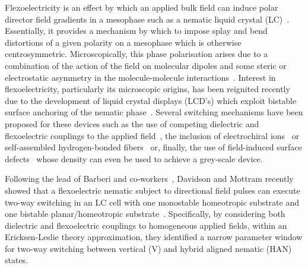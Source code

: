 \documentclass[aps,10pt,twocolumn]{revtex4}
\begin{document}
Flexoelectricity is an effect by which an applied bulk field can induce polar director field gradients in a
mesophase such as a nematic liquid crystal (LC)~\cite{deGennes}. Essentially, it provides a mechanism by which to
impose splay and bend distortions of a given polarity on a mesophase which is otherwise centrosymmetric.
Microscopically, this phase polarisation arises due to a combination of the action of the field on molecular
dipoles and some steric or electrostatic asymmetry in the molecule-molecule
interactions~\cite{Meyer69,ProstMarcerou77,MarcerouProst80}. Interest in flexoelectricity, particularly its
microscopic origins, has been reignited recently due to the development of liquid crystal displays (LCD's) which
exploit bistable surface anchoring of the nematic phase~\cite{ZBD,PSBD}. Several switching mechanisms have been
proposed for these devices such as the use of competing dielectric and flexoelectric couplings to the applied
field~\cite{BarberiGiocondo92}, the inclusion of  electrochiral ions~\cite{BarberiDurand91} or self-assembled
hydrogen-bonded fibers~\cite{MizoshitaSuzuki05} or, finally, the use of field-induced surface
defects~\cite{BarberiGiocondo97} whose density can even be used to achieve a grey-scale device.

Following the lead of Barberi and co-workers~\cite{BarberiGiocondo92,BarberiGiocondo97}, Davidson and Mottram
recently showed that a flexoelectric nematic subject to directional field pulses can execute two-way switching in
an LC cell with one monostable homeotropic substrate and one bistable planar/homeotropic
substrate~\cite{DavidsonMottram02}. Specifically, by considering both dielectric and flexoelectric couplings to
homogeneous applied fields, within an Ericksen-Leslie theory approximation, they identified a narrow parameter
window for two-way switching between vertical (V) and hybrid aligned nematic (HAN) states.
\end{document}
